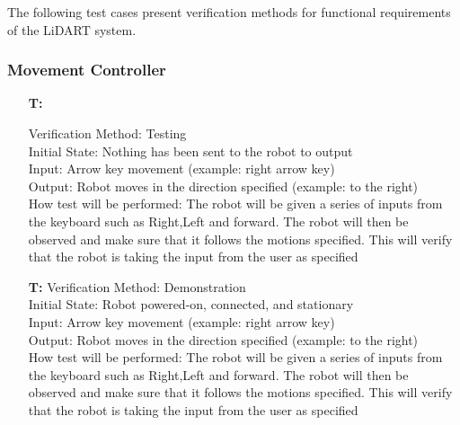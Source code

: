 \documentclass[12pt, titlepage]{article}
\newcounter{tnum} %
\begin{document}
  
The following test cases present verification methods for functional requirements of the LiDART system.


\subsubsection{Movement Controller}


\noindent \begin{itemize}

\item[\textbf{T\refstepcounter{tnum}\thetnum:}]

Verification Method: Testing	\\	
Initial State: Nothing has been sent to the robot to output \\
Input: Arrow key movement (example: right arrow key) \\ 
Output: Robot moves in the direction specified (example: to the right) \\ 
How test will be performed: The robot will be given a series of inputs from the keyboard such as Right,Left and forward. The robot will then be observed and make sure that it follows the motions specified. This will verify that the robot is taking the input from the user as specified \\
	
\item[\textbf{T\refstepcounter{tnum}\thetnum:}]
Verification Method: Demonstration\\
Initial State: Robot powered-on, connected, and stationary \\
Input: Arrow key movement (example: right arrow key) \\ 
Output: Robot moves in the direction specified (example: to the right) \\ 
How test will be performed: The robot will be given a series of inputs from the keyboard such as Right,Left and forward. The robot will then be observed and make sure that it follows the motions specified. This will verify that the robot is taking the input from the user as specified \\


\end{itemize}
\end{document}
